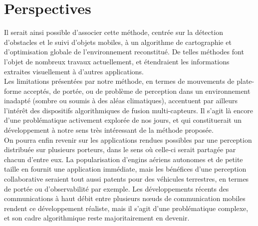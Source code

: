 \section{Perspectives} 
Il serait ainsi possible d'associer cette méthode, centrée sur la détection d'obstacles et le suivi d'objets mobiles, à un algorithme de cartographie et d'optimisation globale de l'environnement reconstitué. De telles méthodes font l'objet de nombreux travaux actuellement, et étendraient les informations extraites visuellement à d'autres applications.\\
Les limitations présentées par notre méthode, en termes de mouvements de plate-forme acceptés, de portée, ou de problème de perception dans un environnement inadapté (sombre ou soumis à des aléas climatiques), accentuent par ailleurs l'intérêt des dispositifs algorithmiques de fusion multi-capteurs. Il s'agit là encore d'une problématique activement explorée de nos jours, et qui constituerait un développement à notre sens très intéressant de la méthode proposée. \\
On pourra enfin revenir sur les applications rendues possibles par une perception distribuée sur plusieurs porteurs, dans le sens où celle-ci serait partagée par chacun d'entre eux. La popularisation d'engins aériens autonomes et de petite taille en fournit une application immédiate, mais les bénéfices d'une perception collaborative seraient tout aussi patents pour des véhicules terrestres, en termes de portée ou d'observabilité par exemple. Les développements récents des communications à haut débit entre plusieurs nœuds de communication mobiles rendent ce développement réaliste, mais il s'agit d'une problématique complexe, et son cadre algorithmique reste majoritairement en devenir.